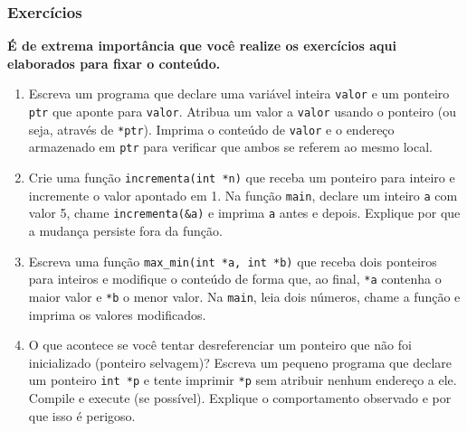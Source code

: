 \subsubsection{Exercícios}

\textbf{É de extrema importância que você realize os exercícios aqui elaborados para fixar o conteúdo.}

\begin{enumerate}
    \item {Escreva um programa que declare uma variável inteira \texttt{valor} e 
        um ponteiro \texttt{ptr} que aponte para \texttt{valor}. Atribua um valor 
        a \texttt{valor} usando o ponteiro (ou seja, através de \texttt{*ptr}). 
        Imprima o conteúdo de \texttt{valor} e o endereço armazenado em 
        \texttt{ptr} para verificar que ambos se referem ao mesmo local.}
    \item {Crie uma função \texttt{incrementa(int *n)} que receba um ponteiro 
        para inteiro e incremente o valor apontado em 1. Na função \texttt{main}, 
        declare um inteiro \texttt{a} com valor 5, chame \texttt{incrementa(\&a)} 
        e imprima \texttt{a} antes e depois. Explique por que a mudança persiste 
        fora da função.}
    \item {Escreva uma função \texttt{max\_min(int *a, int *b)} que receba dois 
        ponteiros para inteiros e modifique o conteúdo de forma que, ao final, 
        \texttt{*a} contenha o maior valor e \texttt{*b} o menor valor. Na 
        \texttt{main}, leia dois números, chame a função e imprima os valores 
        modificados.}
    \item {O que acontece se você tentar desreferenciar um ponteiro que não foi 
        inicializado (ponteiro selvagem)? Escreva um pequeno programa que declare 
        um ponteiro \texttt{int *p} e tente imprimir \texttt{*p} sem atribuir 
        nenhum endereço a ele. Compile e execute (se possível). Explique o 
        comportamento observado e por que isso é perigoso.}
\end{enumerate}
